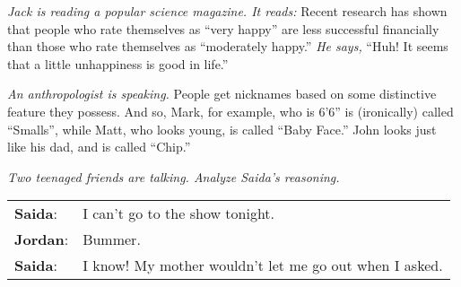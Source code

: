 \begin{exercises}
{}{\vspace{1.5in}}



\item \textit{Jack is reading a popular science magazine. It reads: }Recent research has shown that people who rate themselves as ``very happy'' are less successful financially than those who rate themselves as ``moderately happy.'' \textit{He says,} ``Huh! It seems that a little unhappiness is good in life.''  



\item \textit{An anthropologist is speaking. }People get nicknames based on some distinctive feature they possess. And so, Mark, for example, who is 6'6'' is  (ironically) called ``Smalls'', while Matt, who looks young, is called ``Baby Face.'' John looks just like his dad, and is called ``Chip.'' 





\item \textit{Two teenaged friends are talking. Analyze Saida's reasoning.}
\vspace{-6pt}
\begin{adjustwidth}{2em}{0em}
\begin{longtabu}{p{.1\linewidth}p{.8\linewidth}}
\textbf{Saida}: &I can't go to the show tonight. \\
\textbf{Jordan}:& Bummer. \\
\textbf{Saida}: &I know! My mother wouldn't let me go out when I asked. 
\end{longtabu}
\end{adjustwidth}
\vspace{-.9cm}


\end{exercises}
